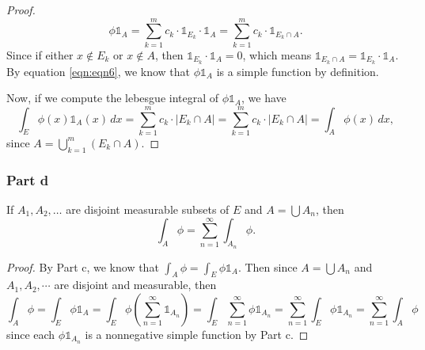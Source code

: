 \begin{answer}
    \begin{proof}
        \begin{equation}\label{eqn:eqn6}
            \phi\mathbb{1}_A = \sum_{k = 1}^{m}c_k \cdot \mathbb{1}_{E_k}\cdot \mathbb{1}_{A} = \sum_{k=1}^{m}c_k \cdot \mathbb{1}_{E_k\cap A}.
        \end{equation}
        Since if either $x \notin E_k$ or $x \notin A$, then $\mathbb{1}_{E_k} \cdot \mathbb{1}_{A} = 0$, which means $\mathbb{1}_{E_k\cap A} = \mathbb{1}_{E_k} \cdot \mathbb{1}_A$. By equation \ref{eqn:eqn6}, we know that $\phi\mathbb{1}_A$ is a simple function by definition.
        
        Now, if we compute the lebesgue integral of $\phi\mathbb{1}_A$, we have
        \begin{equation}
            \int_E \phi(x)\mathbb{1}_A(x) \,dx = \sum_{k=1}^{m} c_k \cdot \lvert E_k \cap A \rvert = \sum_{k=1}^{m} c_{k} \cdot \lvert E_{k} \cap A \rvert = \int_A \phi(x) \,dx,
        \end{equation}
        since $A = \bigcup_{k = 1}^{m} (E_k \cap A)$.
    \end{proof}
\end{answer}

\subsubsection{Part d}

\begin{question}
    If $A_1, A_2, \ldots$ are disjoint measurable subsets of $E$ and $A=\bigcup A_n$, then
    $$
    \int_A \phi=\sum_{n=1}^{\infty} \int_{A_n} \phi .
    $$
\end{question}

\begin{answer}
    \begin{proof}
        By Part c, we know that $\int_A \phi = \int_E \phi \mathbb{1}_A$. Then since $A = \bigcup A_n$ and $A_1,A_2,\cdots$ are disjoint and measurable, then
        \begin{equation}
            \int_A \phi = \int_E \phi \mathbb{1}_A = \int_E \phi(\sum_{n=1}^{\infty} \mathbb{1}_{A_n}) = \int_E \sum_{n=1}^{\infty} \phi\mathbb{1}_{A_n} = \sum_{n=1}^{\infty}\int_E \phi\mathbb{1}_{A_n} = \sum_{n=1}^{\infty} \int_A \phi
        \end{equation}
        since each $\phi\mathbb{1}_{A_n}$ is a nonnegative simple function by Part c.
    \end{proof}
\end{answer}

